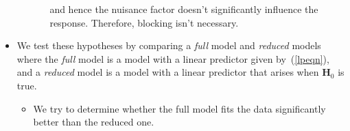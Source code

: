 \begin{itemize}
\begin{enumerate}[(1)]
\begin{itemize}
                              and hence the nuisance factor doesn't significantly influence the response. Therefore, blocking isn't necessary.
                    \end{itemize}
          \end{enumerate}
    \item We test these hypotheses by comparing a \emph{full} model and \emph{reduced} models where the \emph{full} model
          is a model with a linear predictor given by~(\ref{lpeqn}), and a \emph{reduced} model is a model with a linear predictor that arises when $ \mathbf{H}_0 $
          is true.
          \begin{itemize}
              \item We try to determine whether the full model fits the data significantly better than the reduced one.
          \end{itemize}
\end{itemize}
